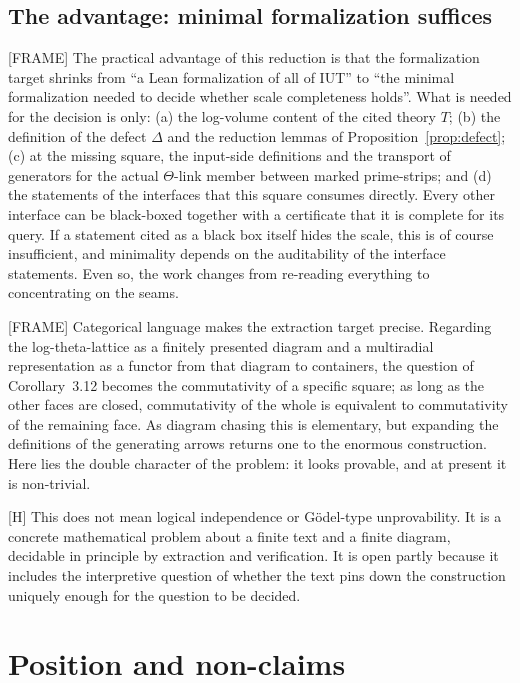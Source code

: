 \documentclass[11pt]{article}
\theoremstyle{plain}
\theoremstyle{definition}
\theoremstyle{remark}
\newcommand{\FRAME}{\textup{[FRAME]}}
\newcommand{\Hmark}{\textup{[H]}}
\begin{document}
\subsection*{The advantage: minimal formalization suffices}

\FRAME{} The practical advantage of this reduction is that the
formalization target shrinks from ``a Lean formalization of all of
IUT'' to ``the minimal formalization needed to decide whether scale
completeness holds''.  What is needed for the decision is only:
(a) the log-volume content of the cited theory $T$; (b) the
definition of the defect $\Delta$ and the reduction lemmas of
Proposition~\ref{prop:defect}; (c) at the missing square, the
input-side definitions and the transport of generators for the
actual $\Theta$-link member between marked prime-strips; and
(d) the statements of the interfaces that this square consumes
directly.  Every other interface can be black-boxed together with a
certificate that it is complete for its query.  If a statement cited
as a black box itself hides the scale, this is of course
insufficient, and minimality depends on the auditability of the
interface statements.  Even so, the work changes from re-reading
everything to concentrating on the seams.

\FRAME{} Categorical language makes the extraction target precise.
Regarding the log-theta-lattice as a finitely presented diagram and
a multiradial representation as a functor from that diagram to
containers, the question of Corollary~3.12 becomes the
commutativity of a specific square; as long as the other faces are
closed, commutativity of the whole is equivalent to commutativity
of the remaining face.  As diagram chasing this is elementary, but
expanding the definitions of the generating arrows returns one to
the enormous construction.  Here lies the double character of the
problem: it looks provable, and at present it is non-trivial.

\Hmark{} This does not mean logical independence or
G\"odel-type unprovability.  It is a concrete mathematical problem
about a finite text and a finite diagram, decidable in principle by
extraction and verification.  It is open partly because it includes
the interpretive question of whether the text pins down the
construction uniquely enough for the question to be decided.

\section{Position and non-claims}
\end{document}
